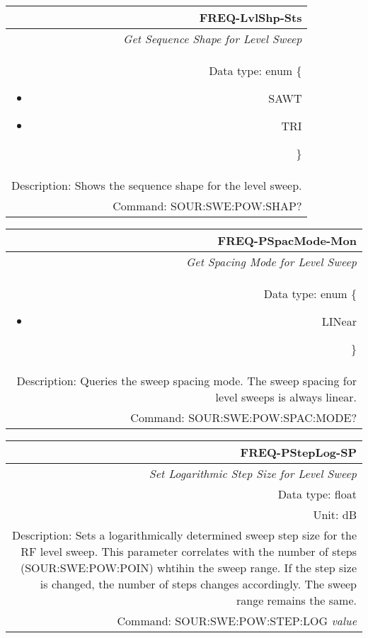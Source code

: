 \documentclass[openany]{article}
\begin{document}
		\begin{tabular}{N}
			\hline
			\bfseries FREQ-LvlShp-Sts \\ \hline
			\emph{Get Sequence Shape for Level Sweep} \\
			Data type: enum \{\begin{itemize}[noitemsep]
				\small
				\item[] SAWT
				\item[] TRI
			\end{itemize}\} \\ 
			Description: Shows the sequence shape for the level sweep. \\
			Command: SOUR:SWE:POW:SHAP? \\

		\end{tabular}
%
		\begin{tabular}{N}
			\hline
			\bfseries FREQ-PSpacMode-Mon \\ \hline
			\emph{Get Spacing Mode for Level Sweep} \\
			Data type: enum \{\begin{itemize}[noitemsep]
				\small
				\item[] LINear
			\end{itemize}\} \\
			Description: Queries the sweep spacing mode. The sweep spacing for level sweeps is always linear. \\
			Command: SOUR:SWE:POW:SPAC:MODE? \\
			
		\end{tabular}
%
		\begin{tabular}{N}
			\hline
			\bfseries FREQ-PStepLog-SP \\ \hline
			\emph{Set Logarithmic Step Size for Level Sweep} \\
			Data type: float \\
			Unit: dB \\ 
			Description: Sets a logarithmically determined sweep step size for the RF level sweep. This parameter correlates with the number of steps (SOUR:SWE:POW:POIN) whtihin the sweep range. If the step size is changed, the number of steps changes accordingly. The sweep range remains the same. \\
			Command: SOUR:SWE:POW:STEP:LOG \emph{value} \\
			
		\end{tabular}
\end{document}
